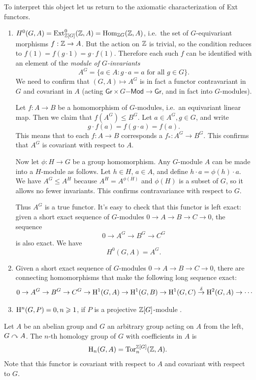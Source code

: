 To interpret this object let us return to the axiomatic characterization of Ext functors.

\begin{enumerate}
    \item $H^0(G,A)=\operatorname{Ext}^0_{\mathbb{Z}[G]}(\mathbb{Z},A)=\operatorname{Hom}_{\mathbb{Z} G}(\mathbb{Z},A)$, i.e.~the set of $G$-equivariant morphisms $f:\mathbb{Z}\to A$. But the action on $\mathbb{Z}$ is trivial, so the condition reduces to $f(1)=f(g\cdot 1)=g\cdot f(1)$. Therefore each such $f$ can be identified with an element of the \emph{module of $G$-invariants}
    \[A^G=\{a\in A:g\cdot a=a\text{ for all }g\in G\}.\]
    We need to confirm that $(G,A)\mapsto A^G$ is in fact a functor contravariant in $G$ and covariant in $A$ (acting $\mathsf{Gr}\times G\mathsf{-Mod}\to \mathsf{Gr}$, and in fact into $G$-modules).

    Let $f:A\to B$ be a homomorphism of $G$-modules, i.e.~an equivariant linear map. Then we claim that $f(A^G)\leq B^G$. Let $a\in A^G, g\in G$, and write
    \[g\cdot f(a)=f(g\cdot a)=f(a).\]
    This means that to each $f:A\to B$ corresponds a $f_\ast :A^G\to B^G$. This confirms that $A^G$ is covariant with respect to $A$.

    Now let $\phi:H\to G$ be a group homomorphism. Any $G$-module $A$ can be made into a $H$-module as follows. Let $h\in H$, $a\in A$, and define $h\cdot a=\phi(h)\cdot a$. We have $A^G\leq A^H$ because $A^H=A^{\phi(H)}$ and $\phi(H)$ is a subset of $G$, so it allows no fewer invariants. This confirms contravariance with respect to $G$. 
    
    Thus $A^G$ is a true functor. It's easy to check that this functor is left exact: given a short exact sequence of $G$-modules $0\to A\to B\to C\to 0$, the sequence
    \[0\to A^G\to B^G\to C^G\]
    is also exact. We have
    \[\boxed{H^0(G,A)=A^G.}\]
    
    \item Given a short exact sequence of $G$-modules $0\to A\to B\to C\to 0$, there are connecting homomorphisms that make the following long sequence exact:
    \[0\to A^G\to B^G\to C^G\to \mathrm{H}^1(G,A)\to \mathrm{H}^1(G,B)\to \mathrm{H}^1(G,C)\overset{\delta}{\to}\mathrm{H}^2(G,A)\to\cdots \]

    \item $\mathrm{H}^n(G,P)=0, n\geqslant 1$, if $P$ is a projective $\mathbb{Z}[G]$-module .
\end{enumerate}


\begin{defn}
    Let $A$ be an abelian group and $G$ an arbitrary group acting on $A$ from the left, $G\curvearrowright A$. The $n$-th homology group of $G$ with coefficients in $A$ is
    \[\mathrm{H}_n(G,A)=\operatorname{Tor}^{\mathbb{Z}[G]}_n(\mathbb{Z},A).\]
    Note that this functor is covariant with respect to $A$ and covariant with respect to $G$.
\end{defn}


